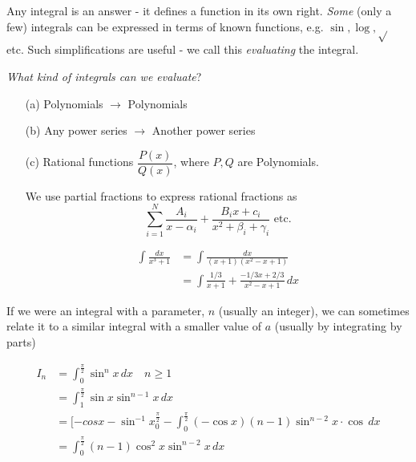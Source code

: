 \documentclass[twoside]{scrartcl}
\begin{document}
\vspace*{5pt}

Any integral is an answer - it defines a function in its own right. \emph{Some} (only a few) integrals can be expressed in terms of known functions, e.g. $\sin, \log, \sqrt{}$ etc. Such simplifications are useful - we call this \emph{evaluating} the integral. 

\emph{What kind of integrals can we evaluate}? 
\begin{itemize}
  \item[(a)] Polynomials $\to$ Polynomials
  \item[(b)] Any power series $\to$ Another power series
  \item[(c)] Rational functions $\dfrac{P(x)}{Q(x)}$, where $P,Q$ are Polynomials. 
  
  We use partial fractions to express rational fractions as 
  \[\sum_{i=1}^N \frac{A_i}{x-\alpha_i} + \frac{B_ix + c_i}{x^2 + \beta_i + \gamma_i}\text{ etc.}\]
  
  \begin{example}
  \[
\begin{aligned}
  \int \frac{dx}{x^3 + 1} &= \int \frac{dx}{(x+1)(x^2-x+1)}\\
  &= \int \frac{1/3}{x+1} + \frac{-1/3x + 2/3}{x^2-x+1}\,dx
\end{aligned}
\]
	
  \end{example}

\end{itemize}



If we were an integral with a parameter, $n$ (usually an integer), we can sometimes relate it to a similar integral with a smaller value of $a$ (usually by integrating by parts)\\

\begin{example}
\[
\begin{aligned}
  I_n &= \int_0^{\frac{\pi}{2}} \sin^nx\,dx \quad n \geq 1 \\
  &= \int_1^{\frac{\pi}{2}} \sin x \sin^{n-1}x\,dx\\
  &= [-cos x - \sin^{-1}x_0^{\frac{\pi}{2}} - \int_0^{\frac{\pi}{2}} (-\cos x)(n-1)\sin^{n-2}x\cdot \cos\,dx\\
  &= \int_0^{\frac{\pi}{2}}(n-1)\cos^2x\sin^{n-2}x\,dx 
\end{aligned}
\]
	
\end{example}
\end{document}
